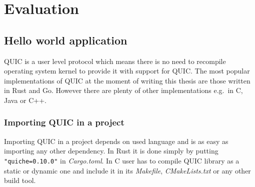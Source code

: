 

\chapter{Evaluation}
\label{ch:evaluation}


\section{Hello world application}
\label{sec:hellow-world-application}
QUIC is a user level protocol which means there is no need to recompile operating system kernel to provide it with support
for QUIC\@.
The most popular implementations of QUIC at the moment of writing this thesis are those written in Rust and Go.
However there are plenty of other implementations e.g.\ in C, Java or C++.

\subsection{Importing QUIC in a project}
\label{subsec:importing-quic-in-a-project}
Importing QUIC in a project depends on used language and is as easy as importing any other dependency.
In Rust it is done simply by putting \lstinline{"quiche=0.10.0"} in \textit{Cargo.toml}.
In C user has to compile QUIC library as a static or dynamic one and include it in its \textit{Makefile}, \textit{CMakeLists.txt}
or any other build tool.

